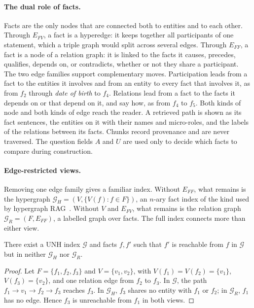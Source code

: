 \documentclass[sigconf, review, anonymous]{acmart}
\newcommand{\sys}{UNH}
\newcommand{\Efv}{E_{FV}}
\newcommand{\Eff}{E_{FF}}
\begin{document}
\paragraph{\textbf{The dual role of facts.}}
Facts are the only nodes that are connected both to entities and to each other. Through $\Efv$, a fact is a hyperedge: it keeps together all participants of one statement, which a triple graph would split across several edges. Through $\Eff$, a fact is a node of a relation graph: it is linked to the facts it causes, precedes, qualifies, depends on, or contradicts, whether or not they share a participant. The two edge families support complementary moves. Participation leads from a fact to the entities it involves and from an entity to every fact that involves it, as from $f_2$ through \emph{date of birth} to $f_4$. Relations lead from a fact to the facts it depends on or that depend on it, and say how, as from $f_4$ to $f_5$. Both kinds of node and both kinds of edge reach the reader. A retrieved path is shown as its fact sentences, the entities on it with their names and micro-roles, and the labels of the relations between its facts. Chunks record provenance and are never traversed. The question fields $A$ and $U$ are used only to decide which facts to compare during construction.

\paragraph{\textbf{Edge-restricted views.}}
Removing one edge family gives a familiar index. Without $\Eff$, what remains is the hypergraph $\mathcal{G}_H = (V, \{V(f) : f \in F\})$, an $n$-ary fact index of the kind used by hypergraph RAG~\cite{luo2025hypergraphrag}. Without $V$ and $\Efv$, what remains is the relation graph $\mathcal{G}_R = (F, \Eff)$, a labelled graph over facts. The full index connects more than either view.

\begin{proposition}
\label{prop:views}
There exist a \sys{} index $\mathcal{G}$ and facts $f, f'$ such that $f'$ is reachable from $f$ in $\mathcal{G}$ but in neither $\mathcal{G}_H$ nor $\mathcal{G}_R$.
\end{proposition}

\begin{proof}
Let $F = \{f_1, f_2, f_3\}$ and $V = \{v_1, v_2\}$, with $V(f_1) = V(f_2) = \{v_1\}$, $V(f_3) = \{v_2\}$, and one relation edge from $f_2$ to $f_3$. In $\mathcal{G}$, the path $f_1 \to v_1 \to f_2 \to f_3$ reaches $f_3$. In $\mathcal{G}_H$, $f_3$ shares no entity with $f_1$ or $f_2$; in $\mathcal{G}_R$, $f_1$ has no edge. Hence $f_3$ is unreachable from $f_1$ in both views.
\end{proof}
\end{document}
